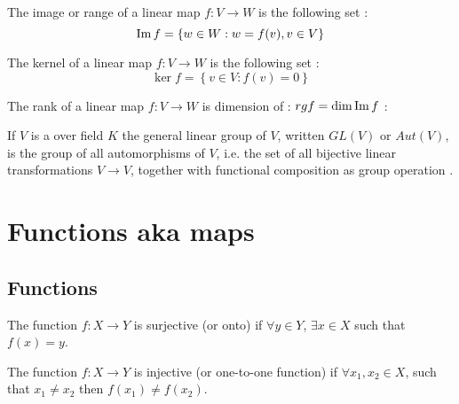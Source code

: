 \begin{appendices}
\begin{definition}[Image]
  The image or range of a linear map $f: V \to W$ is the following
  set \cite{wiki:linearmap}:
  \[
  \operatorname{Im} f = \left\{
  w \in W: w = f(v), v \in V
  \right\}
  \]
  \label{def:image}
\end{definition}

\begin{definition}[Kernel]
  The kernel of a linear map $f: V \to W$ is the following
  set \cite{wiki:kernel}:
  \[
  \ker f = \left\{
  v \in V: f(v) = 0
  \right\}
  \]
  \label{def:kernel}
\end{definition}


\begin{definition}[Rank]
  The rank of a linear map $f: V \to W$ is dimension of
  : $rg f = \dim \operatorname{Im} f$ \cite{wiki:rank}:
  \label{def:rank}
\end{definition}

\begin{definition}
  If $V$ is a  over field $K$  the general
  linear group of $V$, written $GL\left(V\right)$ or
  $Aut\left(V\right)$, is the group of all automorphisms of $V$,
  i.e. the set of all bijective linear transformations $V \to V$,
  together with functional composition as group operation \cite{wiki:glg}.  
  \label{def:glv}
\end{definition}

\section{Functions aka maps}

\subsection{Functions}

\begin{definition}[Surjection]
  The function $f: X \rightarrow Y$ is surjective (or onto) if
  $\forall y \in Y$, $\exists x \in X$ such that
  $f\left(x\right) = y$.
  \label{def:surjection}
\end{definition}

\begin{definition}[Injection]
  The function $f: X \rightarrow Y$ is injective (or one-to-one function) if
  $\forall x_1, x_2 \in X$, such that $x_1 \ne x_2$ then
  $f\left(x_1\right) \ne f\left(x_2\right)$.
  \label{def:injection}
\end{definition}


\end{appendices}
